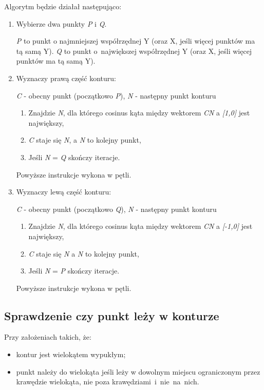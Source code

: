 \documentclass[a4paper,11pt]{article}
\begin{document}
\noindent
Algorytm będzie działał następująco:
\begin{enumerate}
\item Wybierze dwa punkty \textit{P} i \textit{Q}.

\textit{P} to punkt o najmniejszej współrzędnej Y (oraz X, jeśli więcej punktów ma tą samą Y). \textit{Q} to punkt o~największej współrzędnej Y (oraz X, jeśli więcej punktów ma tą samą Y).

\item Wyznaczy prawą część konturu:

\textit{C} - obecny punkt (początkowo \textit{P}), \textit{N} - następny punkt konturu 
\begin{enumerate}
\item Znajdzie \textit{N}, dla którego cosinus kąta między wektorem \textit{CN} a\textit{ [1,0]} jest największy,
\item \textit{C} staje się \textit{N}, a \textit{N} to kolejny punkt,
\item Jeśli \textit{N} = \textit{Q} skończy iteracje.
\end{enumerate}
Powyższe instrukcje wykona w pętli.

\item Wyznaczy lewą część konturu:

\textit{C} - obecny punkt (początkowo \textit{Q}), \textit{N} - następny punkt konturu 
\begin{enumerate}
\item Znajdzie \textit{N}, dla którego cosinus kąta między wektorem \textit{CN} a\textit{ [-1,0]} jest największy,
\item \textit{C} staje się \textit{N} a \textit{N} to kolejny punkt,
\item Jeśli \textit{N} = \textit{P} skończy iteracje.
\end{enumerate}
Powyższe instrukcje wykona w pętli.
\end{enumerate}

\subsection{Sprawdzenie czy punkt leży w konturze}

\noindent
Przy założeniach takich, że:
\begin{itemize}
\item kontur jest wielokątem wypukłym;
\item punkt należy do wielokąta jeśli leży w dowolnym miejscu ograniczonym przez krawędzie wielokąta, nie poza krawędziami~i~nie~na~nich.
\end{itemize}
\end{document}
